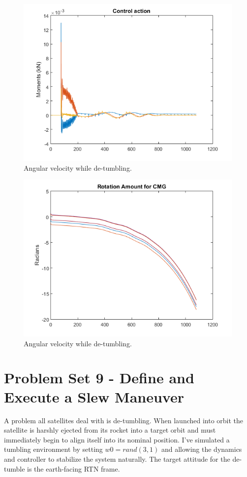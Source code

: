 \documentclass[12pt, letterpaper]{article}
\begin{document}
\begin{figure}[H]
	\centering
	\includegraphics[scale=0.9]{ps8_04}
	\caption{Angular velocity while de-tumbling.}
	\label{8:angvel}
\end{figure}


\begin{figure}[H]
	\centering
	\includegraphics[scale=0.9]{ps8_05}
	\caption{Angular velocity while de-tumbling.}
	\label{8:angvel}
\end{figure}





\section{Problem Set 9 - Define and Execute a Slew Maneuver}
A problem all satellites deal with is de-tumbling. When launched into orbit the satellite is harshly ejected from its rocket into a target orbit and must immediately begin to align itself into its nominal position. I've simulated a tumbling environment by setting $w0=rand(3,1)$ and allowing the dynamics and controller to stabilize the system naturally. The target attitude for the de-tumble is the earth-facing RTN frame.
\end{document}
